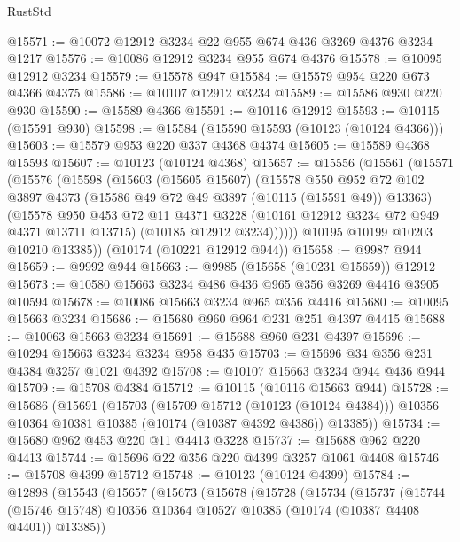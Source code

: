 \begin{lexlean}{RustStd}
\begin{coremodule}
@15571 := @10072 @12912 @3234 @22 @955 @674 @436 @3269 @4376 @3234 @1217
@15576 := @10086 @12912 @3234 @955 @674 @4376
@15578 := @10095 @12912 @3234
@15579 := @15578 @947
@15584 := @15579 @954 @220 @673 @4366 @4375
@15586 := @10107 @12912 @3234
@15589 := @15586 @930 @220 @930
@15590 := @15589 @4366
@15591 := @10116 @12912
@15593 := @10115 (@15591 @930)
@15598 := @15584 (@15590 @15593 (@10123 (@10124 @4366)))
@15603 := @15579 @953 @220 @337 @4368 @4374
@15605 := @15589 @4368 @15593
@15607 := @10123 (@10124 @4368)
@15657 := @15556
    (@15561
      (@15571
        (@15576
          (@15598
            (@15603
              (@15605 @15607)
              (@15578
                @550
                @952
                @72
                @102
                @3897
                @4373
                (@15586 @49 @72 @49 @3897 (@10115 (@15591 @49)) @13363)
                (@15578
                  @950
                  @453
                  @72
                  @11
                  @4371
                  @3228
                  (@10161 @12912 @3234 @72 @949 @4371 @13711 @13715)
                  (@10185 @12912 @3234))))))
        @10195
        @10199
        @10203
        @10210
        @13385))
    (@10174 (@10221 @12912 @944))
@15658 := @9987 @944
@15659 := @9992 @944
@15663 := @9985 (@15658 (@10231 @15659)) @12912
@15673 := @10580 @15663 @3234 @486 @436 @965 @356 @3269 @4416 @3905 @10594
@15678 := @10086 @15663 @3234 @965 @356 @4416
@15680 := @10095 @15663 @3234
@15686 := @15680 @960 @964 @231 @251 @4397 @4415
@15688 := @10063 @15663 @3234
@15691 := @15688 @960 @231 @4397
@15696 := @10294 @15663 @3234 @3234 @958 @435
@15703 := @15696 @34 @356 @231 @4384 @3257 @1021 @4392
@15708 := @10107 @15663 @3234 @944 @436 @944
@15709 := @15708 @4384
@15712 := @10115 (@10116 @15663 @944)
@15728 := @15686
    (@15691
      (@15703
        (@15709 @15712 (@10123 (@10124 @4384)))
        @10356
        @10364
        @10381
        @10385
        (@10174 (@10387 @4392 @4386))
        @13385))
@15734 := @15680 @962 @453 @220 @11 @4413 @3228
@15737 := @15688 @962 @220 @4413
@15744 := @15696 @22 @356 @220 @4399 @3257 @1061 @4408
@15746 := @15708 @4399 @15712
@15748 := @10123 (@10124 @4399)
@15784 := @12898
    (@15543
      (@15657
        (@15673
          (@15678
            (@15728
              (@15734
                (@15737
                  (@15744
                    (@15746 @15748)
                    @10356
                    @10364
                    @10527
                    @10385
                    (@10174 (@10387 @4408 @4401))
                    @13385))

\end{coremodule}
\end{lexlean}
